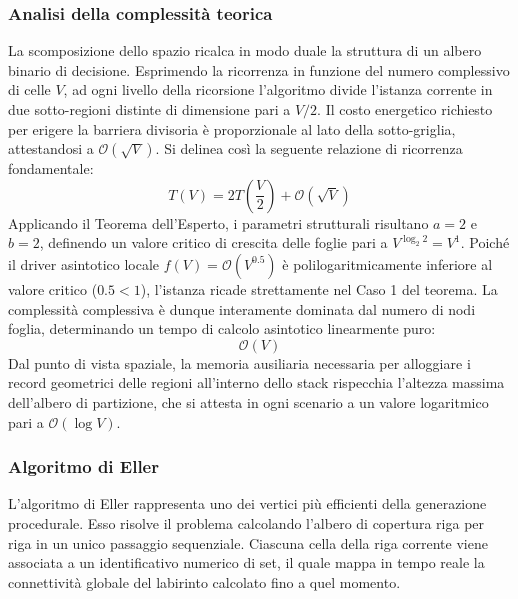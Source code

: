 \documentclass[12pt, a4paper]{article}
\begin{document}
	\subsubsection{Analisi della complessità teorica}
	La scomposizione dello spazio ricalca in modo duale la struttura di un albero binario di decisione. Esprimendo la ricorrenza in funzione del numero complessivo di celle $V$, ad ogni livello della ricorsione l'algoritmo divide l'istanza corrente in due sotto-regioni distinte di dimensione pari a $V/2$. Il costo energetico richiesto per erigere la barriera divisoria è proporzionale al lato della sotto-griglia, attestandosi a $\mathcal{O}(\sqrt{V})$. Si delinea così la seguente relazione di ricorrenza fondamentale:$$T(V) = 2T\left(\frac{V}{2}\right) + \mathcal{O}(\sqrt{V})$$Applicando il Teorema dell'Esperto, i parametri strutturali risultano $a=2$ e $b=2$, definendo un valore critico di crescita delle foglie pari a $V^{\log_2 2} = V^1$. Poiché il driver asintotico locale $f(V) = \mathcal{O}(V^{0.5})$ è polilogaritmicamente inferiore al valore critico ($0.5 < 1$), l'istanza ricade strettamente nel Caso 1 del teorema. La complessità complessiva è dunque interamente dominata dal numero di nodi foglia, determinando un tempo di calcolo asintotico linearmente puro:$$\mathcal{O}(V)$$Dal punto di vista spaziale, la memoria ausiliaria necessaria per alloggiare i record geometrici delle regioni all'interno dello stack rispecchia l'altezza massima dell'albero di partizione, che si attesta in ogni scenario a un valore logaritmico pari a $\mathcal{O}(\log V)$.
	
	\subsubsection{Algoritmo di Eller}
	L'algoritmo di Eller rappresenta uno dei vertici più efficienti della generazione procedurale. Esso risolve il problema calcolando l'albero di copertura riga per riga in un unico passaggio sequenziale. Ciascuna cella della riga corrente viene associata a un identificativo numerico di set, il quale mappa in tempo reale la connettività globale del labirinto calcolato fino a quel momento.
	
\end{document}
